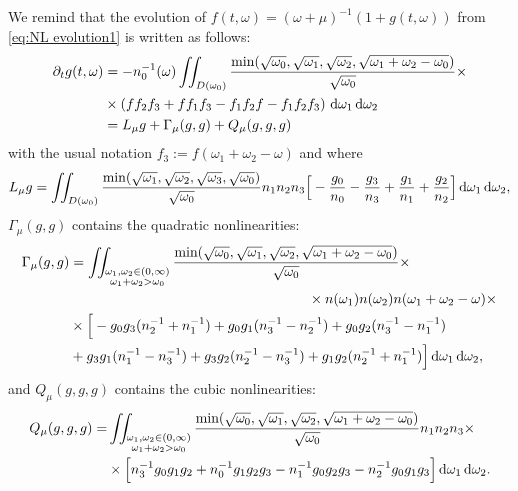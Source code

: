 \documentclass[reqno,11pt,letterpaper]{amsart}
\numberwithin{equation}{section}
\newcommand{\dd}{\, {\rm d}}
\begin{document}
We remind that the evolution of $f(t,\omega)=(\omega+\mu)^{-1}(1+g(t,\omega))$ from \eqref{eq:NL evolution1} is written as follows: 
\begin{equation}\label{eq:NL evolution3}
\begin{split}
    \partial_t g(t,\omega) &= -n_0^{-1}(\omega)
     \iint_{D(\omega_0)} \frac{\text{min}(\sqrt{\omega_0},\sqrt{\omega_1},\sqrt{\omega_2},\sqrt{\omega_1+\omega_2-\omega_0})}{\sqrt{\omega_0}} \times \\ 
     & \times  \left( f f_2 f_3 + f f_1 f_3 - f_1 f_2 f - f_1 f_2 f_3  \right) \dd \omega_1 \dd \omega_2   \\
 &= L_\mu g +  \Gamma_\mu(g,g) + Q_\mu(g,g,g)
 \end{split}
\end{equation}
with the usual notation $f_3:= f(\omega_1+ \omega_2-\omega)$ and where 
\begin{align*}
L_\mu g = \iint_{D(\omega_0)} \frac{\min (\sqrt{\omega_1}, \sqrt{\omega_2}, \sqrt{\omega_3}, \sqrt{\omega_0})}{ \sqrt{\omega_0}} n_1n_2n_3 \Big[-\frac{g_0}{n_0}  - \frac{g_3}{n_3} + \frac{g_1}{n_1} + \frac{g_2}{n_2}   
\Big] \dd \omega_1 \dd \omega_2, 
\end{align*} 
$ \Gamma_\mu (g,g)$ contains the quadratic nonlinearities: 
\begin{equation}\label{eq: def of Gamma}
\begin{split} 
\Gamma_\mu(g,g) &= \iint_{\substack{\omega_1, \omega_2 \in (0,\infty)\\ \omega_1+\omega_2>\omega_0}}  \frac{\text{min}(\sqrt{\omega_0},\sqrt{\omega_1},\sqrt{\omega_2},\sqrt{\omega_1+\omega_2-\omega_0})}{\sqrt{\omega_0}} 
\times \\
& \hskip 6cm  \times n(\omega_1)n(\omega_2)n(\omega_1+\omega_2-\omega)\times \\
&\times \Big[ -g_0g_3 ( n_2^{-1} + n_1^{-1} ) + 
    g_0g_1 ( n_3^{-1} - n_2^{-1}) + g_0g_2 (n_3^{-1} - n_1^{-1}) \\ 
    &\hspace{0cm} + 
    g_3g_1 (n_1^{-1} - n_3^{-1}) + g_3g_2 (n_2^{-1} - n_3^{-1}) + g_1g_2 (n_2^{-1} + n_1^{-1}  )
\Big] \dd \omega_1 \dd\omega_2, 
\end{split}
\end{equation} 
 and $Q_\mu(g,g,g)$ contains the cubic nonlinearities: 
\begin{equation}\label{eq: def of Q}
\begin{split} 
 Q_\mu(g,g,g)
 = 
 &\iint_{\substack{\omega_1, \omega_2 \in (0,\infty)\\ \omega_1+\omega_2>\omega_0}}  \frac{\text{min}(\sqrt{\omega_0},\sqrt{\omega_1},\sqrt{\omega_2},\sqrt{\omega_1+\omega_2-\omega_0})}{\sqrt{\omega_0}} 
   n_1n_2n_3\times \\
  &\hspace{0cm}\times \Big[   n_3^{-1} g_0g_1g_2  +  n_0^{-1}g_1g_2g_3 -  n_1^{-1}g_0g_2g_3  -  n_2^{-1}g_0g_1g_3 \Big] \dd \omega_1 \dd \omega_2.
 \end{split}
\end{equation}  
\end{document}
